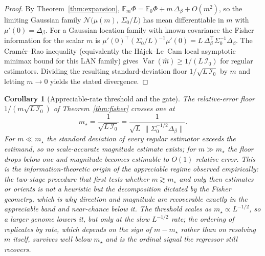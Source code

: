 \documentclass[11pt]{article}
\theoremstyle{plain}
\newtheorem{cor}[thm]{Corollary}
\theoremstyle{definition}
\theoremstyle{remark}
\begin{document}
\begin{proof}
By Theorem~\ref{thm:expansion}, $\mathbb{E}_m\Phi=\mathbb{E}_0\Phi+m\,\Delta_\beta+O(m^2)$, so
the limiting Gaussian family $\mathcal{N}\!\big(\mu(m),\,\Sigma_0/L\big)$ has mean
differentiable in $m$ with $\mu'(0)=\Delta_\beta$. For a Gaussian location family with known
covariance the Fisher information for the scalar $m$ is
$\mu'(0)^\top(\Sigma_0/L)^{-1}\mu'(0)=L\,\Delta_\beta^\top\Sigma_0^{-1}\Delta_\beta$. The
Cram\'er--Rao inequality (equivalently the H\'ajek--Le~Cam local asymptotic minimax bound for
this LAN family) gives $\operatorname{Var}(\widehat m)\ge 1/(L\,\mathcal{I}_0)$ for regular
estimators. Dividing the resulting standard-deviation floor $1/\sqrt{L\,\mathcal{I}_0}$ by $m$
and letting $m\to 0$ yields the stated divergence.
\end{proof}

\begin{cor}[Appreciable-rate threshold and the gate]\label{cor:appreciable-threshold}
The relative-error floor $1/(m\sqrt{L\,\mathcal I_0})$ of Theorem~\ref{thm:fisher} crosses one at
\[
   m_\star=\frac{1}{\sqrt{L\,\mathcal I_0}}=\frac{1}{\sqrt{L}\,\lVert\Sigma_0^{-1/2}\Delta_\beta\rVert}.
\]
For $m\ll m_\star$ the standard deviation of every regular estimator exceeds the estimand, so no
scale-accurate magnitude estimate exists; for $m\gg m_\star$ the floor drops below one and magnitude
becomes estimable to $O(1)$ relative error. This is the information-theoretic origin of the
appreciable regime observed empirically: the two-stage procedure that first tests whether
$m\gtrsim m_\star$ and only then estimates or orients is not a heuristic but the decomposition
dictated by the Fisher geometry, which is why direction and magnitude are recoverable exactly in the
appreciable band and near-chance below it. The threshold scales as $m_\star\propto L^{-1/2}$, so a
larger genome lowers it, but only at the slow $L^{-1/2}$ rate; the ordering of replicates by rate,
which depends on the sign of $m-m_\star$ rather than on resolving $m$ itself, survives well below
$m_\star$ and is the ordinal signal the regressor still recovers.
\end{cor}
\end{document}
